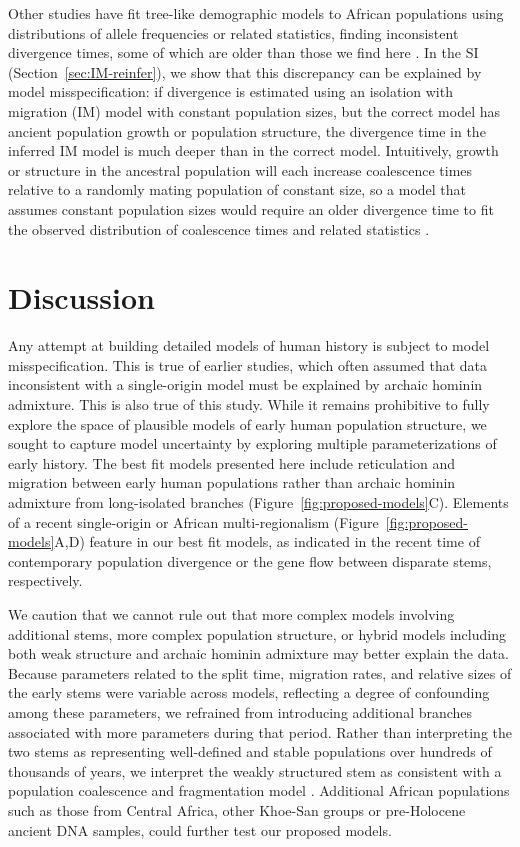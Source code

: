 \documentclass[]{article}
\begin{document}
Other studies have fit tree-like demographic models to African populations
using distributions of allele frequencies or related statistics, finding
inconsistent divergence times, some of which are older than those we find here
\cite{Henn2018-rf,Bergstrom2021-iw}. In the SI (Section~\ref{sec:IM-reinfer}),
we show that this discrepancy can be explained by model misspecification: if
divergence is estimated using an isolation with migration (IM) model with
constant population sizes, but the correct model has ancient population growth
or population structure, the divergence time in the inferred IM model is much
deeper than in the correct model. Intuitively, growth or structure in the
ancestral population will each increase coalescence times relative to a
randomly mating population of constant size, so a model that assumes constant
population sizes would require an older divergence time to fit the observed
distribution of coalescence times and related statistics
\citep{Momigliano2021-th,Shchur2022-wa}.  

\section*{Discussion}

Any attempt at building detailed models of human history is subject to model
misspecification. This is true of earlier studies, which often assumed that
data inconsistent with a single-origin model must be explained by archaic
hominin admixture. This is also true of this study. While it remains
prohibitive to fully explore the space of plausible models of early human
population structure, we sought to capture model uncertainty by exploring
multiple parameterizations of early history. The best fit models presented
here include reticulation and migration between early human populations rather
than archaic hominin admixture from long-isolated branches
(Figure~\ref{fig:proposed-models}C). 
Elements of a recent single-origin or African multi-regionalism
(Figure~\ref{fig:proposed-models}A,D)
feature in our best fit models, as indicated in the recent time of
contemporary population divergence
or the gene flow between disparate stems, respectively.

We caution that we cannot rule out that more complex models involving
additional stems, more complex population structure, or
hybrid models including both weak structure and archaic hominin admixture may
better explain the data. Because parameters related to the split time,
migration rates, and relative sizes of the early stems were variable across
models, reflecting a degree of confounding among these parameters, we refrained
from introducing additional branches associated with more parameters during
that period. Rather than interpreting the two stems as representing
well-defined and stable populations over hundreds of thousands of years, we
interpret the weakly structured stem as consistent with a population
coalescence and fragmentation model \citep{Scerri2019-xg}.
Additional African populations such as those 
from Central Africa, other Khoe-San groups or pre-Holocene ancient DNA samples,
could further test our proposed models.
\end{document}
